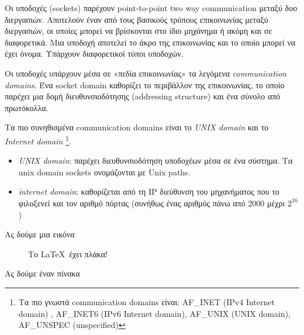\documentclass[DIV=calc, paper=a4, fontsize=10pt, twocolumn]{scrartcl}	 %
\begin{document}
Οι υποδοχές (sockets) παρέχουν point-to-point two way communication μεταξύ δυο διεργασιών. Αποτελούν έναν από τους βασικούς τρόπους
επικοινωνίας μεταξύ διεργασιών, οι οποίες μπορεί να βρίσκονται στο ίδιο μηχάνημα ή ακόμη και σε διαφορετικά. Μια υποδοχή αποτελεί το άκρο
της επικοινωνίας και το οποίο μπορεί να έχει όνομα. Υπάρχουν διαφορετικοί τύποι υποδοχών.

Οι υποδοχές υπάρχουν μέσα σε «πεδία επικοινωνίας» τα λεγόμενα \emph{communication domains}. Ένα socket domain καθορίζει το περιβάλλον της
επικοινωνίας, το οποίο παρέχει μια δομή διευθυνσιοδότησης (addressing structure) και ένα σύνολο από πρωτόκολλα.

Τα πιο συνηθισμένα communication domains είναι το \emph{UNIX domain} και το \emph{Internet domain} \footnote{Τα πιο γνωστά communication
domains είναι: AF\_INET (IPv4 Internet domain) , AF\_INET6 (IPv6 Internet domain), AF\_UNIX (UNIX domain), AF\_UNSPEC (unspecified)}.

\begin{itemize}
 \item \emph{UNIX domain}: παρέχει διευθυνσιοδότηση υποδοχέων μέσα σε ένα σύστημα. Τα unix domain sockets ονομάζονται με Unix paths. 
 \item \emph{internet domain}: καθορίζεται από τη IP διεύθυνση του μηχανήματος που το φιλοξενεί και τον αριθμό πόρτας (συνήθως ένας αριθμός
πάνω από 2000 μέχρι $2^{16}$) 
\end{itemize}




 
Ας δούμε μια εικόνα 
\begin{figure}[ht] 
\centering
{}
\caption{Το \LaTeX\ έχει πλάκα!}
\label{endianess}
\end{figure}


Ας δούμε έναν πίνακα
\end{document}
